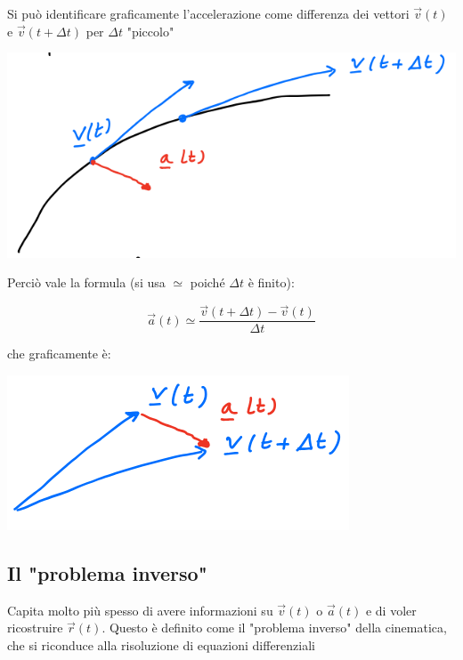 \documentclass{article}
\begin{document}
\noindent
Si può identificare graficamente l'accelerazione come differenza dei vettori $\vec{v}(t)$ e $\vec{v}(t + \Delta t)$ per $\Delta t$ "piccolo"

\includegraphics[width=\columnwidth]{rappresentazione-accelerazione-grafica-differenza}

\noindent
Perciò vale la formula (si usa $\simeq$ poiché $\Delta t$ è finito):

$$
\vec{a}(t) \simeq \frac{\vec{v}(t + \Delta t) - \vec{v}(t)}{\Delta t}
$$

\noindent
che graficamente è:

\includegraphics[width=\columnwidth]{rappresentazione-accelerazione-grafica-approssimazione}

\subsection{Il "problema inverso"}

Capita molto più spesso di avere informazioni su $\vec{v}(t)$ o $\vec{a}(t)$ e di voler ricostruire $\vec{r}(t)$. Questo è definito come il "problema inverso" della cinematica, che si riconduce alla risoluzione di equazioni differenziali
\end{document}
